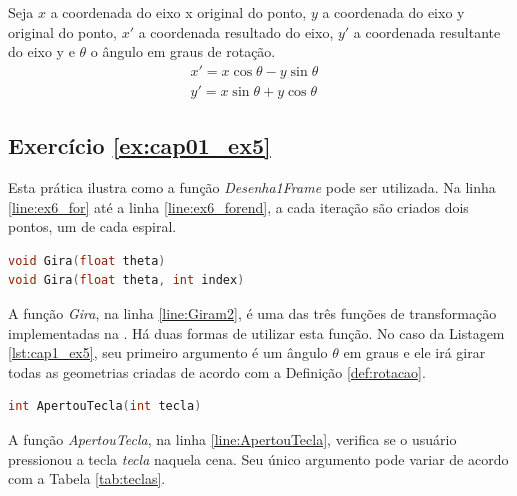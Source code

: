 \begin{myDef} 
Seja $x$ a coordenada do eixo x original do ponto, $y$ a coordenada do eixo y original do ponto, $x'$ a coordenada resultado do eixo, $y'$ a coordenada resultante do eixo y e $\theta$ o ângulo em graus de rotação.
$$
  \begin{matrix}
  x' = x\cos \theta  - y \sin \theta &\\
  y' = x\sin \theta  + y \cos \theta
  \end{matrix}
$$
\label{def:rotacao}
\end{myDef}


\subsection*{Exercício \ref{ex:cap01_ex5}}

Esta prática ilustra como a função \emph{Desenha1Frame} pode ser utilizada. Na linha \ref{line:ex6_for} até a linha \ref{line:ex6_forend}, a cada iteração são criados dois pontos, um de cada espiral.


\begin{lstlisting}[label={func:Gira},language=C++]
void Gira(float theta)
void Gira(float theta, int index)
\end{lstlisting}
A função \emph{Gira}, na linha \ref{line:Giram2}, é uma das três funções de transformação implementadas na \playAPC{}. Há duas formas de utilizar esta função. No caso da Listagem \ref{lst:cap1_ex5}, seu primeiro argumento é um ângulo $\theta$ em graus e ele irá girar todas as geometrias criadas de acordo com a Definição \ref{def:rotacao}. 


\begin{lstlisting}[label={func:ApertouTecla},language=C++]
int ApertouTecla(int tecla)
\end{lstlisting}
A função \emph{ApertouTecla}, na linha \ref{line:ApertouTecla}, verifica se o usuário pressionou a tecla \emph{tecla} naquela cena. Seu único argumento pode variar de acordo com a Tabela \ref{tab:teclas}.

